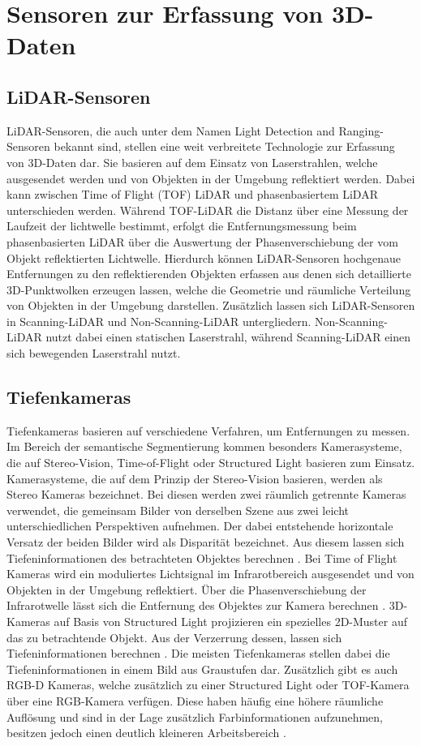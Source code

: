 \chapter{Sensoren zur Erfassung von 3D-Daten}

\section{LiDAR-Sensoren}
LiDAR-Sensoren, die auch unter dem Namen Light Detection and Ranging-Sensoren
bekannt sind, stellen eine weit verbreitete Technologie zur Erfassung von
3D-Daten dar. Sie basieren auf dem Einsatz von Laserstrahlen, welche
ausgesendet werden und von Objekten in der Umgebung reflektiert werden. Dabei
kann zwischen Time of Flight (TOF) LiDAR und phasenbasiertem LiDAR
unterschieden werden. Während TOF-LiDAR die Distanz über eine Messung der
Laufzeit der lichtwelle bestimmt, erfolgt die Entfernungsmessung beim
phasenbasierten LiDAR über die Auswertung der Phasenverschiebung der vom Objekt
reflektierten Lichtwelle. Hierdurch können LiDAR-Sensoren hochgenaue
Entfernungen zu den reflektierenden Objekten erfassen aus denen sich
detaillierte 3D-Punktwolken erzeugen lassen, welche die Geometrie und räumliche
Verteilung von Objekten in der Umgebung darstellen. Zusätzlich lassen sich
LiDAR-Sensoren in Scanning-LiDAR und Non-Scanning-LiDAR untergliedern.
Non-Scanning-LiDAR nutzt dabei einen statischen Laserstrahl, während
Scanning-LiDAR einen sich bewegenden Laserstrahl nutzt. \cite{8529992}

\section{Tiefenkameras}
Tiefenkameras basieren auf verschiedene Verfahren, um Entfernungen zu messen.
Im Bereich der semantische Segmentierung kommen besonders Kamerasysteme, die
auf Stereo-Vision, Time-of-Flight oder Structured Light basieren zum Einsatz.
Kamerasysteme, die auf dem Prinzip der Stereo-Vision basieren, werden als
Stereo Kameras bezeichnet. Bei diesen werden zwei räumlich getrennte Kameras
verwendet, die gemeinsam Bilder von derselben Szene aus zwei leicht
unterschiedlichen Perspektiven aufnehmen. Der dabei entstehende horizontale
Versatz der beiden Bilder wird als Disparität bezeichnet. Aus diesem lassen
sich Tiefeninformationen des betrachteten Objektes berechnen \cite{8932817}.
Bei Time of Flight Kameras wird ein moduliertes Lichtsignal im Infrarotbereich
ausgesendet und von Objekten in der Umgebung reflektiert. Über die
Phasenverschiebung der Infrarotwelle lässt sich die Entfernung des Objektes zur
Kamera berechnen \cite{7025195}. 3D-Kameras auf Basis von Structured Light
projizieren ein spezielles 2D-Muster auf das zu betrachtende Objekt. Aus der
Verzerrung dessen, lassen sich Tiefeninformationen berechnen \cite{7992709}.
Die meisten Tiefenkameras stellen dabei die Tiefeninformationen in einem Bild
aus Graustufen dar. Zusätzlich gibt es auch RGB-D Kameras, welche zusätzlich zu
einer Structured Light oder TOF-Kamera über eine RGB-Kamera verfügen. Diese
haben häufig eine höhere räumliche Auflösung und sind in der Lage zusätzlich
Farbinformationen aufzunehmen, besitzen jedoch einen deutlich kleineren
Arbeitsbereich \cite{9262651}.

